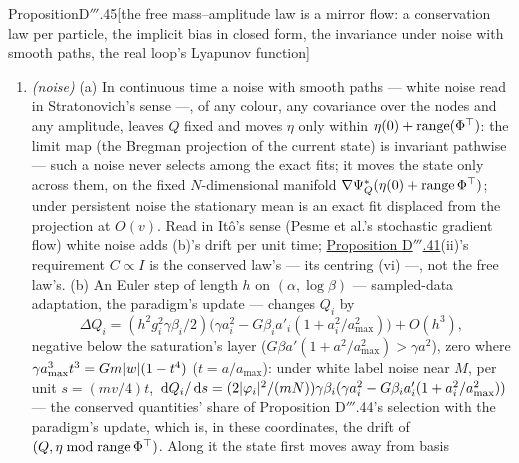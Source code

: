 \begin{thm}{Proposition}{D$'''$.45}[the free mass--amplitude law is a mirror flow: a conservation law per particle, the
implicit bias in closed form, the invariance under noise with smooth paths, the real loop's Lyapunov
function]
\begin{enumerate}[label=\textup{(\roman*)}]
    $\lambda_1(1\mp(2/\pi)\arcsin\theta)$ (\hyperref[res:thmDppp:47]{Proposition D$'''$.47}). (On a branch the barrier is
    an entropy and the approach $\varepsilon^{\mu_j}$, \hyperref[res:thmDppp:47]{Proposition D$'''$.47}(iii).) Its cost
    is time: the transit to the support takes a time $\propto(\beta^0)^{-1/2}$
    (\hyperref[res:thmDppp:48]{Proposition D$'''$.48}), the last digits a time $\propto1/(\beta^0)^2$ when the support has
    fewer than $N$ atoms (the off-support curvature $\dd w/\dd\eta\propto(\beta^0)^2$). From nonzero amplitudes at tiny
    masses the particles sit on branches ($Q_i < -c$, their signs frozen): their limit is the Bregman projection onto
    the sign-constrained least-squares fits --- \hyperref[res:thmDppp:47]{Proposition D$'''$.47}; an exact fit may cease
    to exist, and the bias is basis pursuit only where the frozen signs allow it.
  \item \emph{(noise)} (a) In continuous time a noise with smooth paths --- white noise read in Stratonovich's sense
    ---, of any colour, any covariance over the nodes and any amplitude, leaves $Q$ fixed and moves $\eta$ only within
    $\eta(0) + \operatorname{range}(\Phi^\top)$: the limit map (the Bregman projection of the current state) is invariant
    pathwise --- such a noise never selects among the exact fits; it moves the state only across them, on the fixed
    $N$-dimensional manifold $\nabla\Psi^*_Q(\eta(0) + \operatorname{range}\Phi^\top)$; under persistent noise the
    stationary mean is an exact fit displaced from the projection at $O(v)$. Read in It\^o's sense (Pesme et al.'s
    stochastic gradient flow) white noise adds (b)'s drift per unit time;
    \hyperref[res:thmDppp:41]{Proposition D$'''$.41}(ii)'s requirement $C\propto I$ is the conserved law's --- its
    centring (vi) ---, not the free law's. (b) An Euler step of length $h$ on $(\alpha,\log\beta)$ --- sampled-data
    adaptation, the paradigm's update --- changes $Q_i$ by
    \[
      \Delta Q_i = (h^2g_i^2\gamma\beta_i/2)\big(\gamma a_i^2 - G\beta_ia'_i(1 + a_i^2/a_{\max}^2)\big) + O(h^3),
    \]
    negative below the saturation's layer ($G\beta a'(1 + a^2/a_{\max}^2) > \gamma a^2$), zero where
    $\gamma a_{\max}^3t^3 = Gm\lvert w\rvert(1 - t^4)$ ($t = a/a_{\max}$): under white label noise near $M$, per unit
    $s = (mv/4)t$,
    $\,\mathrm{d} Q_i/\,\mathrm{d} s = (2\lvert \varphi_i\rvert^2/(mN))\gamma\beta_i(\gamma a_i^2 - G\beta_ia'_i(1 + a_i^2/a_{\max}^2))$ --- the
    conserved quantities' share of Proposition D$'''$.44's selection with the paradigm's update, which is, in these
    coordinates, the drift of $(Q,\eta\bmod\operatorname{range}\Phi^\top)$. Along it the state first moves away from basis

\end{enumerate}
\end{thm}
